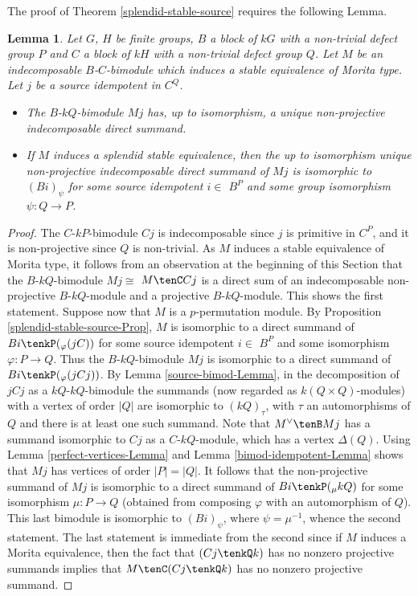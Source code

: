 \documentclass{amsart}
\theoremstyle{plain}\newtheorem{Theorem}{Theorem}[section]
\theoremstyle{plain}\newtheorem{Conjecture}[Theorem]{Conjecture}
\theoremstyle{plain}\newtheorem{Corollary}[Theorem]{Corollary}
\theoremstyle{plain}\newtheorem{Lemma}[Theorem]{Lemma}
\theoremstyle{plain}\newtheorem{Proposition}[Theorem]{Proposition}
\theoremstyle{definition}\newtheorem{Definition}[Theorem]{Definition}
\theoremstyle{definition}\newtheorem{Example}[Theorem]{Example}
\theoremstyle{definition}\newtheorem{Examples}[Theorem]{Examples}
\theoremstyle{definition}\newtheorem{Exercise}[Theorem]{Exercise}
\theoremstyle{definition}\newtheorem{Notation}[Theorem]{Notation}
\theoremstyle{definition}\newtheorem{Remark}[Theorem]{Remark}
\theoremstyle{definition}\newtheorem{Remarks}[Theorem]{Remarks}
\theoremstyle{plain}\newtheorem{Statement}[Theorem]{}
\begin{document}
The proof of Theorem \ref{splendid-stable-source} requires the following Lemma.

\begin{Lemma} \label{splendid-source-Lemma}
Let $G$, $H$ be finite groups, $B$ a block of $kG$ with a non-trivial defect group 
$P$ and $C$ a block of $kH$ with a non-trivial defect group $Q$. Let $M$ be an 
indecomposable $B$-$C$-bimodule which induces a stable equivalence of Morita
type. Let $j$ be a source idempotent in $C^Q$.  
\begin{itemize}
\item[{\rm (i)}]
The $B$-$kQ$-bimodule $Mj$ has, up to isomorphism, a unique non-projective 
indecomposable direct summand.
\item[{\rm (ii)}]
 If $M$ induces a splendid stable equivalence, then the up to isomorphism
 unique non-projective indecomposable direct summand of $Mj$ is isomorphic 
 to $(Bi)_{\psi}$ for some source idempotent $i\in$ $B^P$ and some group 
 isomorphism  $\psi : Q\to P$. 
 \end{itemize}
\end{Lemma}

\begin{proof}
The $C$-$kP$-bimodule $Cj$ is indecomposable since $j$ is primitive in $C^P$,
and it is non-projective since $Q$ is non-trivial. As $M$ induces a stable
equivalence of Morita type, it follows from an  observation  at the beginning of
this Section  that the $B$-$kQ$-bimodule $Mj\cong$ 
$M\tenC Cj$ is a direct sum of an
indecomposable non-projective $B$-$kQ$-module and a projective 
$B$-$kQ$-module. This shows the first statement. 
Suppose now that $M$ is a  $p$-permutation module.
By  Proposition \ref{splendid-stable-source-Prop}, $M$ is isomorphic to a direct 
summand of 
$Bi\tenkP (_\varphi{(jC)})$ for some source idempotent $i\in$ $B^P$ and some
isomorphism $\varphi : P\to Q$. Thus the $B$-$kQ$-bimodule $Mj$ is isomorphic 
to a direct summand of $Bi\tenkP (_\varphi(jCj))$. By Lemma 
\ref{source-bimod-Lemma}, in the decomposition  of  $jCj$ as a 
$kQ$-$kQ$-bimodule  the summands (now regarded as  $k(Q\times Q)$-modules) 
with a vertex of order $|Q|$  are isomorphic to $(kQ)_\tau$, with $\tau$ an 
automorphisms of $Q$ and there is at least one such summand. 
Note that $M^\vee\tenB Mj$ has a summand isomorphic 
to $Cj$ as a $C$-$kQ$-module, which has a vertex $\Delta(Q)$.
Using Lemma \ref{perfect-vertices-Lemma} and Lemma 
\ref{bimod-idempotent-Lemma} shows  that $Mj$ has vertices of order $|P|=|Q|$.
It follows that the  non-projective summand of $Mj$ is isomorphic to a direct 
summand of $Bi\tenkP (_\mu kQ)$ for some isomorphism $\mu : P\to Q$ (obtained 
from composing $\varphi$ with an automorphism of $Q$). This last bimodule
is isomorphic to $(Bi)_\psi$, where $\psi=\mu^{-1}$, whence  the  second statement.  
The last statement is immediate  from the second  since  if $M$ induces a  Morita 
equivalence, then the  fact that   $(Cj\tenkQ k)$ has no nonzero projective 
summands implies  that  $M\tenC (Cj\tenkQ k)$  has no  nonzero projective summand.
\end{proof}
\end{document}
